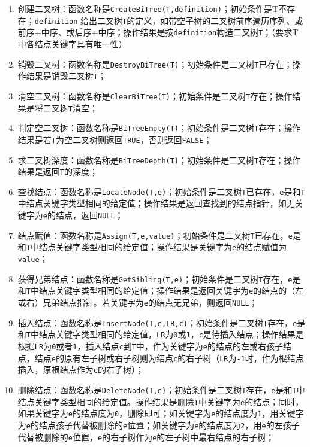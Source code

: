 \documentclass[supercite]{Experimental_Report}
\theoremstyle{definition}
\begin{document}
\begin{enumerate}
	\item 创建二叉树：函数名称是\verb|CreateBiTree(T,definition)|；初始条件是T不存在；\verb|definition| 给出二叉树\verb|T|的定义，如带空子树的二叉树前序遍历序列、或前序+中序、或后序+中序；操作结果是按\verb|definition|构造二叉树\verb|T|；（要求T中各结点关键字具有唯一性）
	\item 销毁二叉树：函数名称是\verb|DestroyBiTree(T)|；初始条件是二叉树\verb|T|已存在；操作结果是销毁二叉树\verb|T|；
	\item 清空二叉树：函数名称是\verb|ClearBiTree(T)|；初始条件是二叉树\verb|T|存在；操作结果是将二叉树\verb|T|清空；
	\item 判定空二叉树：函数名称是\verb|BiTreeEmpty(T)|；初始条件是二叉树\verb|T|存在；操作结果是若\verb|T|为空二叉树则返回\verb|TRUE|，否则返回\verb|FALSE|；
	\item 求二叉树深度：函数名称是\verb|BiTreeDepth(T)|；初始条件是二叉树\verb|T|存在；操作结果是返回\verb|T|的深度；
	\item 查找结点：函数名称是\verb|LocateNode(T,e)|；初始条件是二叉树\verb|T|已存在，\verb|e|是和\verb|T|中结点关键字类型相同的给定值；操作结果是返回查找到的结点指针，如无关键字为\verb|e|的结点，返回\verb|NULL|；
	\item 结点赋值：函数名称是\verb|Assign(T,e,value)|；初始条件是二叉树\verb|T|已存在，\verb|e|是和\verb|T|中结点关键字类型相同的给定值；操作结果是关键字为\verb|e|的结点赋值为\verb|value|；
	\item 获得兄弟结点：函数名称是\verb|GetSibling(T,e)|；初始条件是二叉树\verb|T|存在，\verb|e|是和\verb|T|中结点关键字类型相同的给定值；操作结果是返回关键字为\verb|e|的结点的（左或右）兄弟结点指针。若关键字为\verb|e|的结点无兄弟，则返回\verb|NULL|；
	\item 插入结点：函数名称是\verb|InsertNode(T,e,LR,c)|；初始条件是二叉树\verb|T|存在，\verb|e|是和\verb|T|中结点关键字类型相同的给定值，\verb|LR|为\verb|0|或\verb|1|，\verb|c|是待插入结点；操作结果是根据\verb|LR|为\verb|0|或者\verb|1|，插入结点\verb|c|到\verb|T|中，作为关键字为\verb|e|的结点的左或右孩子结点，结点\verb|e|的原有左子树或右子树则为结点\verb|c|的右子树（\verb|LR|为\verb|-1|时，作为根结点插入，原根结点作为\verb|c|的右子树）；
	\item 删除结点：函数名称是\verb|DeleteNode(T,e)|；初始条件是二叉树\verb|T|存在，\verb|e|是和\verb|T|中结点关键字类型相同的给定值。操作结果是删除\verb|T|中关键字为\verb|e|的结点；同时，如果关键字为\verb|e|的结点度为\verb|0|，删除即可；如关键字为\verb|e|的结点度为\verb|1|，用关键字为\verb|e|的结点孩子代替被删除的\verb|e|位置；如关键字为\verb|e|的结点度为\verb|2|，用\verb|e|的左孩子代替被删除的\verb|e|位置，\verb|e|的右子树作为\verb|e|的左子树中最右结点的右子树；

\end{enumerate}
\end{document}
